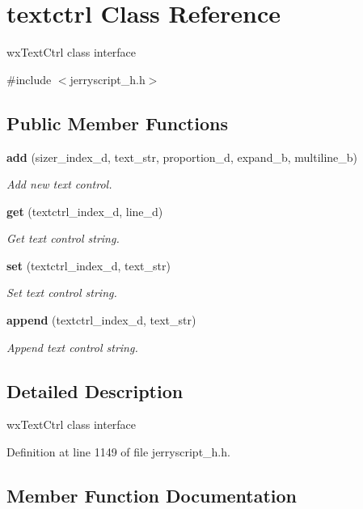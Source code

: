 \section{textctrl Class Reference}
\label{classtextctrl}


wx\+Text\+Ctrl class interface  




{\ttfamily \#include $<$jerryscript\+\_\+h.\+h$>$}

\subsection*{Public Member Functions}
\begin{DoxyCompactItemize}
\item 
\textbf{ add} (sizer\+\_\+index\+\_\+d, text\+\_\+str, proportion\+\_\+d, expand\+\_\+b, multiline\+\_\+b)
\begin{DoxyCompactList}\small\item\em Add new text control. \end{DoxyCompactList}\item 
\textbf{ get} (textctrl\+\_\+index\+\_\+d, line\+\_\+d)
\begin{DoxyCompactList}\small\item\em Get text control string. \end{DoxyCompactList}\item 
\textbf{ set} (textctrl\+\_\+index\+\_\+d, text\+\_\+str)
\begin{DoxyCompactList}\small\item\em Set text control string. \end{DoxyCompactList}\item 
\textbf{ append} (textctrl\+\_\+index\+\_\+d, text\+\_\+str)
\begin{DoxyCompactList}\small\item\em Append text control string. \end{DoxyCompactList}\end{DoxyCompactItemize}


\subsection{Detailed Description}
wx\+Text\+Ctrl class interface 

Definition at line 1149 of file jerryscript\+\_\+h.\+h.



\subsection{Member Function Documentation}
\mbox{\label{classtextctrl_a68fb628585859b9a9869ce32b3307ea0}} 
